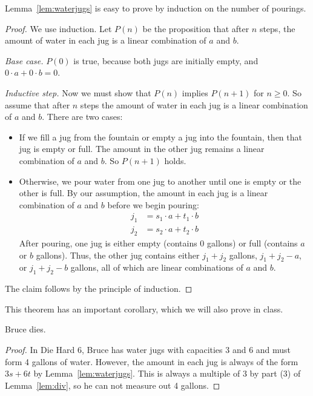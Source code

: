 Lemma~\ref{lem:waterjugs} is easy to prove by induction on the number of
pourings.

\begin{proof}
We use induction.  Let $P(n)$ be the proposition that after $n$ steps,
the amount of water in each jug is a linear combination of $a$ and
$b$.

\noindent \textit{Base case.}  $P(0)$ is true, because both jugs are
initially empty, and $0 \cdot a + 0 \cdot b = 0$.

\noindent \textit{Inductive step.}  Now we must show that $P(n)$
implies $P(n+1)$ for $n \geq 0$.  So assume that after $n$ steps the
amount of water in each jug is a linear combination of $a$ and $b$.
There are two cases:
%
\begin{itemize}
%
\item If we fill a jug from the fountain or empty a jug into the
fountain, then that jug is empty or full.  The amount in the other jug
remains a linear combination of $a$ and $b$.  So $P(n+1)$ holds.

\item Otherwise, we pour water from one jug to another until one is
empty or the other is full.  By our assumption, the amount in each jug
is a linear combination of $a$ and $b$ before we begin pouring:
%
\begin{align*}
j_1 & = s_1 \cdot a + t_1 \cdot b \\
j_2 & = s_2 \cdot a + t_2 \cdot b
\end{align*}
%
After pouring, one jug is either empty (contains 0 gallons) or full
(contains $a$ or $b$ gallons).  Thus, the other jug contains either
$j_1 + j_2$ gallons, $j_1 + j_2 - a$, or $j_1 + j_2 - b$ gallons, all
of which are linear combinations of $a$ and $b$.
\end{itemize}
%
The claim follows by the principle of induction.
\end{proof}

This theorem has an important corollary, which we will also
prove in class.

\begin{corollary}
Bruce dies.
\end{corollary}

\begin{proof}
In Die Hard 6, Bruce has water jugs with capacities 3 and 6 and must
form 4 gallons of water.  However, the amount in each jug is always of
the form $3s + 6t$ by Lemma~\ref{lem:waterjugs}.  This is always a
multiple of 3 by part (3) of Lemma~\ref{lem:div}, so he can not
measure out 4 gallons.
\end{proof}


